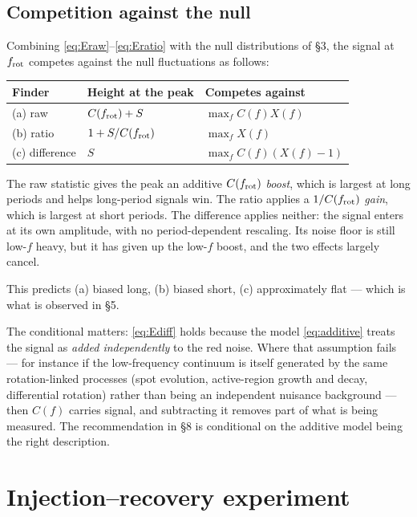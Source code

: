 \documentclass[11pt]{article}
\begin{document}
\subsection{Competition against the null}

Combining \eqref{eq:Eraw}--\eqref{eq:Eratio} with the null distributions of \S3, the
signal at $f_{\rm rot}$ competes against the null fluctuations as follows:

\begin{table}[htbp]
\centering
\begin{tabular}{lll}
\toprule
Finder & Height at the peak & Competes against \\
\midrule
(a) raw        & $C(f_{\rm rot}) + S$   & $\max_f C(f)X(f)$ \\
(b) ratio      & $1 + S/C(f_{\rm rot})$ & $\max_f X(f)$ \\
(c) difference & $S$                    & $\max_f C(f)(X(f)-1)$ \\
\bottomrule
\end{tabular}
\end{table}

The raw statistic gives the peak an additive $C(f_{\rm rot})$ \emph{boost}, which is
largest at long periods and helps long-period signals win. The ratio applies a
$1/C(f_{\rm rot})$ \emph{gain}, which is largest at short periods. The difference applies
neither: the signal enters at its own amplitude, with no period-dependent rescaling. Its
noise floor is still low-$f$ heavy, but it has given up the low-$f$ boost, and the two
effects largely cancel.

This predicts (a) biased long, (b) biased short, (c) approximately flat --- which is what
is observed in \S5.

The conditional matters: \eqref{eq:Ediff} holds because the model \eqref{eq:additive}
treats the signal as \emph{added independently} to the red noise. Where that assumption
fails --- for instance if the low-frequency continuum is itself generated by the same
rotation-linked processes (spot evolution, active-region growth and decay, differential
rotation) rather than being an independent nuisance background --- then $C(f)$ carries
signal, and subtracting it removes part of what is being measured. The recommendation in
\S8 is conditional on the additive model being the right description.

\section{Injection--recovery experiment}
\end{document}

